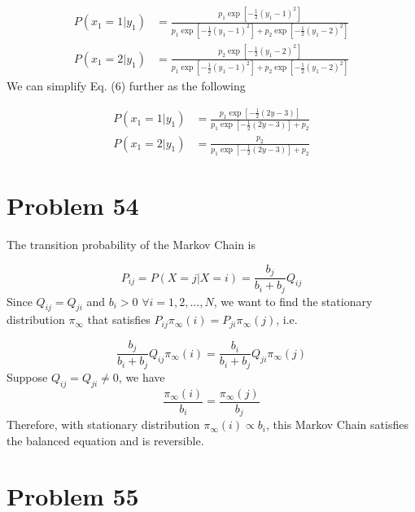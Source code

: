 \documentclass[a4paper, 11pt]{article}
\begin{document}
\begin{equation}
\begin{split}
P(x_1 = 1|y_1) & = \frac{p_1\exp\left[{-\frac{1}{2}(y_1-1)^2}\right]}{p_1\exp\left[{-\frac{1}{2}(y_1-1)^2}\right] + p_2\exp\left[{-\frac{1}{2}(y_1-2)^2}\right]} \\
P(x_1 = 2|y_1) & = \frac{p_2\exp\left[{-\frac{1}{2}(y_1-2)^2}\right]}{p_1\exp\left[{-\frac{1}{2}(y_1-1)^2}\right] + p_2\exp\left[{-\frac{1}{2}(y_1-2)^2}\right]}
\end{split}
\end{equation}
We can simplify Eq. (6) further as the following

\begin{equation}
\begin{split}
P(x_1 = 1|y_1) & = \frac{p_1\exp\left[{-\frac{1}{2}(2y-3)}\right]}{p_1\exp\left[{-\frac{1}{2}(2y-3)}\right] + p_2} \\
P(x_1 = 2|y_1) & = \frac{p_2}{p_1\exp\left[{-\frac{1}{2}(2y-3)}\right] + p_2}
\end{split}
\end{equation}


\section*{Problem 54}

The transition probability of the Markov Chain is 

\begin{equation}
P_{ij} = P(X=j|X=i) = \frac{b_j}{b_i + b_j}Q_{ij}
\end{equation}
Since $Q_{ij} = Q_{ji}$ and $b_i > 0$ $\forall i=1,2,\dots, N$, we want to find the stationary distribution $\pi_\infty$ that satisfies $P_{ij}\pi_\infty(i) = P_{ji}\pi_\infty(j)$, i.e.

\begin{equation}
\frac{b_j}{b_i + b_j}Q_{ij}\pi_\infty(i) = \frac{b_i}{b_i + b_j}Q_{ji}\pi_\infty(j)
\end{equation}
Suppose $Q_{ij}=Q_{ji}\neq 0$, we have
\begin{equation}
\frac{\pi_\infty(i)}{b_i} = \frac{\pi_\infty(j)}{b_j}
\end{equation}
Therefore, with stationary distribution $\pi_\infty(i) \propto b_i$, this Markov Chain satisfies the balanced equation and is reversible. 


\section*{Problem 55}
\end{document}
